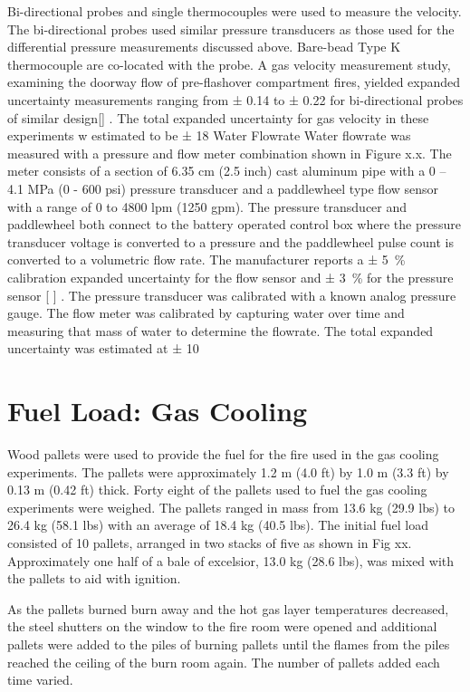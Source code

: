 \documentclass[12pt,oneside]{book}
\begin{document}
Bi-directional probes and single thermocouples were used to measure the velocity.  The bi-directional probes used similar pressure transducers as those used for the differential pressure measurements discussed above.   Bare-bead Type K thermocouple are co-located with the probe. A gas velocity measurement study, examining the doorway flow of pre-flashover compartment fires, yielded expanded uncertainty measurements ranging from ± 0.14 to ± 0.22 for bi-directional probes of similar design[] .  The total expanded uncertainty for gas velocity in these experiments w estimated to be  ± 18 %
Water Flowrate
Water flowrate was measured with a pressure and flow meter combination shown in Figure x.x. The meter consists of a section of 6.35 cm (2.5 inch) cast aluminum pipe with a 0 – 4.1 MPa (0 - 600 psi) pressure transducer and a paddlewheel type flow sensor with a range of 0 to 4800 lpm (1250 gpm). The pressure transducer and paddlewheel both connect to the battery operated control box where the pressure transducer voltage is converted to a pressure and the paddlewheel pulse count is converted to a volumetric flow rate.  The manufacturer reports a ± 5~\% calibration expanded uncertainty for the flow sensor and ± 3~\%  for the pressure sensor [ ] . The pressure transducer was calibrated with a known analog pressure gauge. The flow meter was calibrated by capturing water over time and measuring that mass of water to determine the flowrate. The total expanded uncertainty was estimated at ± 10 %

\section{Fuel Load: Gas Cooling}
\label{sec:Fuel_Load:_Gas_Cooling} 

Wood pallets were used to provide the fuel for the fire used in the gas cooling experiments.  The pallets were approximately   1.2 m (4.0 ft) by 1.0 m (3.3 ft) by 0.13 m (0.42 ft) thick.  Forty eight of the pallets used to fuel the gas cooling experiments were weighed.  The pallets ranged in mass from 13.6 kg (29.9 lbs) to 26.4 kg (58.1 lbs) with an average of 18.4 kg (40.5 lbs).  The initial fuel load consisted of 10 pallets, arranged in two stacks of five as shown in Fig xx.  Approximately one half of a bale of excelsior, 13.0  kg (28.6 lbs), was mixed with the pallets to aid with ignition.  

As the pallets burned burn away and the hot gas layer temperatures decreased, the steel shutters on the window to the fire room were opened and additional pallets were added to the piles of burning pallets until the flames from the piles reached the ceiling of the burn room again.  The number of pallets added each time varied.
\end{document}
